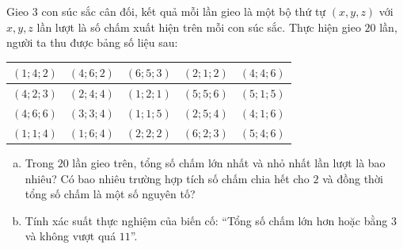 \begin{bt}%
Gieo $3$ con súc sắc cân đối, kết quả mỗi lần gieo là một bộ thứ tự $(x, y, z)$ với $x, y, z$ lần lượt là số chấm xuất hiện trên mỗi con súc sắc. Thực hiện gieo $20$ lần, người ta thu được bảng số liệu sau:
\begin{center}
\begin{tabular}{|c|c|c|c|c|}
\hline
$(1; 4; 2)$ & $(4; 6; 2)$ & $(6; 5; 3)$ & $(2; 1; 2)$ & $(4; 4; 6)$ \\ \hline
$(4; 2; 3)$ & $(2; 4; 4)$ & $(1; 2; 1)$ & $(5; 5; 6)$ & $(5; 1; 5)$ \\ \hline
$(4; 6; 6)$ & $(3; 3; 4)$ & $(1; 1; 5)$ & $(2; 5; 4)$ & $(4; 1; 6)$ \\ \hline
$(1; 1; 4)$ & $(1; 6; 4)$ & $(2; 2; 2)$ & $(6; 2; 3)$ & $(5; 4; 6)$ \\ \hline
\end{tabular}
\end{center}
\begin{enumerate}[a)]
	\item Trong $20$ lần gieo trên, tổng số chấm lớn nhất và nhỏ nhất lần lượt là bao nhiêu? Có bao nhiêu trường hợp tích số chấm chia hết cho $2$ và đồng thời tổng số chấm là một số nguyên tố?
	\item Tính xác suất thực nghiệm của biến cố: ``Tổng số chấm lớn hơn hoặc bằng $3$ và không vượt quá $11$''.
\end{enumerate}
\end{bt}
